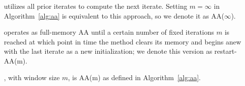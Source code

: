 \documentclass[11pt]{article}
\begin{document}
  utilizes all prior iterates to compute the next iterate. Setting $m=\infty$ in Algorithm~\ref{alg:aa} is equivalent to this approach, so we denote it %
as AA($\infty$).

 operates as full-memory AA until a certain number of fixed iterations $m$ is reached at which point in time the method clears its memory and begins anew with the last iterate as a new initialization; we denote this version as restart-AA(m).%

, with window size $m$, is AA(m) as defined in Algorithm~\ref{alg:aa}.
\end{document}
